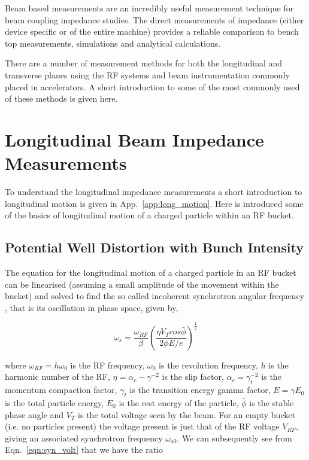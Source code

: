 \label{chap:BBmeas}

Beam based measurements are an incredibly useful measurement technique for beam coupling impedance studies. The direct measurements of impedance (either device specific or of the entire machine) provides a reliable comparison to bench top measurements, simulations and analytical calculations. 

There are a number of measurement methods for both the longitudinal and transverse planes using the RF systems and beam instrumentation commonly placed in accelerators. A short introduction to some of the most commonly used of these methods is given here.

\section{Longitudinal Beam Impedance Measurements}

To understand the longitudinal impedance measurements a short introduction to longitudinal motion is given in App.~\ref{app:long_motion}. Here is introduced some of the basics of longitudinal motion of a charged particle within an RF bucket.

\subsection{Potential Well Distortion with Bunch Intensity}
\label{sec:pot-well-dist}

The equation for the longitudinal motion of a charged particle in an RF bucket can be linearised (assuming a small amplitude of the movement within the bucket) and solved to find the so called incoherent synchrotron angular frequency \cite{Metral:longBunchModes, Metral:StabCrit}, that is its oscillation in phase space, given by,

\begin{equation}
\omega_{s} = \frac{\omega_{RF}}{\beta} \left( \frac{\eta V_{T}cos\bar{\phi}}{2\phi E/e}  \right)^{\frac{1}{2}}
\label{eqn:syn_volt}
\end{equation}

where $\omega_{RF} = h\omega_{0}$ is the RF frequency, $\omega_{0}$ is the revolution frequency, $h$ is the harmonic
number of the RF, $\eta = \alpha_{c} - \gamma^{-2}$ is the slip factor, $\alpha_{c} = \gamma_{t}^{-2}$ is the momentum compaction factor, $\gamma_{t}$ is the transition energy gamma factor, $E=\gamma E_{0}$ is the total particle energy, $E_{0}$ is the rest energy of the particle, $\bar{\phi}$ is the stable phase angle and $V_{T}$ is the total voltage seen by the beam. For an empty bucket (i.e. no particles present) the voltage present is just that of the RF voltage $V_{RF}$, giving an associated synchrotron frequency $\omega_{s0}$. We can subsequently see from Eqn.~\ref{eqn:syn_volt} that we have the ratio


